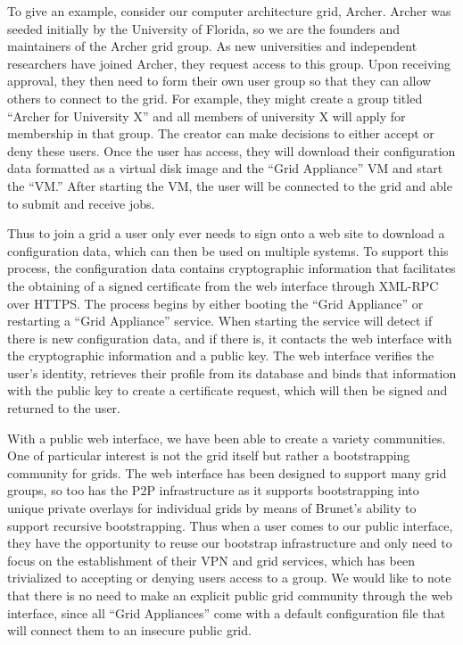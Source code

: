 \documentclass[conference]{IEEEtran}
\begin{document}
To give an example, consider our computer architecture grid, Archer.  Archer
was seeded initially by the University of Florida, so we are the founders and
maintainers of the Archer grid group.  As new universities and independent
researchers have joined Archer, they request access to this group.  Upon
receiving approval, they then need to form their own user group so that they
can allow others to connect to the grid.  For example, they might create a
group titled ``Archer for University X'' and all members of university X will
apply for membership in that group.  The creator can make decisions to either
accept or deny these users.  Once the user has access, they will download their
configuration data formatted as a virtual disk image and the ``Grid Appliance''
VM and start the ``VM.''  After starting the VM, the user will be connected to
the grid and able to submit and receive jobs.

Thus to join a grid a user only ever needs to sign onto a web site to download
a configuration data, which can then be used on multiple systems.  To support
this process, the configuration data contains cryptographic information that
facilitates the obtaining of a signed certificate from the web interface
through XML-RPC over HTTPS.  The process begins by either booting the ``Grid
Appliance'' or restarting a ``Grid Appliance'' service.  When starting the
service will detect if there is new configuration data, and if there is, it
contacts the web interface with the cryptographic information and a public key.
The web interface verifies the user's identity, retrieves their profile from
its database and binds that information with the public key to create a
certificate request, which will then be signed and returned to the user.

With a public web interface, we have been able to create a variety communities.
One of particular interest is not the grid itself but rather a bootstrapping
community for grids.  The web interface has been designed to support many grid
groups, so too has the P2P infrastructure as it supports bootstrapping into
unique private overlays for individual grids by means of Brunet's ability to
support recursive bootstrapping.  Thus when a user comes to our public
interface, they have the opportunity to reuse our bootstrap infrastructure and
only need to focus on the establishment of their VPN and grid services, which
has been trivialized to accepting or denying users access to a group.  We would
like to note that there is no need to make an explicit public grid community
through the web interface, since all ``Grid Appliances'' come with a default
configuration file that will connect them to an insecure public grid.  
\end{document}
